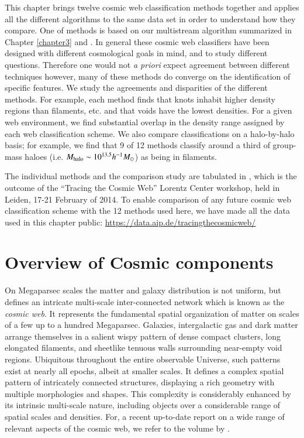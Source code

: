 This chapter brings twelve cosmic web classification methods together and applies all the different algorithms to the same data set in order to understand how they compare. One of methods is based on our multistream algorithm summarized in Chapter \ref{chapter3} and \cite{Ramachandra2015}. In general these cosmic web classifiers have been designed with different cosmological goals in mind, and to study different questions. Therefore one would not {\it a priori} expect agreement between different techniques however, many of these methods do converge on the identification of specific features. We study the agreements and disparities of the different methods. For example, each method finds that knots inhabit higher density regions than filaments, etc. and that voids have the lowest densities. For a given web environment, we find substantial overlap in the density range assigned by each web classification scheme. We also compare classifications on a halo-by-halo basis; for example, we find that 9 of 12 methods classify around a third of group-mass haloes (i.e. $M_{\rm halo}\sim10^{13.5}h^{-1}M_{\odot}$) as being in filaments. 

The individual methods and the comparison study are tabulated in \cite{Libeskind2018}, which is the outcome of the ``Tracing the Cosmic Web'' Lorentz Center workshop, held in Leiden, 17-21 February of 2014. To enable comparison of any future cosmic web classification scheme with the 12 methods used here, we have made all the data used in this chapter public: \url{https://data.aip.de/tracingthecosmicweb/}


\section{Overview of Cosmic components}
\label{section:6intro}
On Megaparsec scales the matter and galaxy distribution is not uniform, but defines an intricate multi-scale inter-connected network 
which is known as the \emph{cosmic web}. It represents the fundamental spatial organization of 
matter on scales of a few up to a hundred Megaparsec. Galaxies, intergalactic gas and dark matter arrange themselves in a salient wispy 
pattern of dense compact clusters, long elongated filaments, and sheetlike tenuous walls surrounding near-empty void regions. Ubiquitous throughout  
the entire observable Universe, such patterns  exist at nearly all epochs, albeit at smaller scales. It defines a complex spatial 
pattern of intricately connected structures, displaying a rich geometry with multiple morphologies and shapes. This complexity is 
considerably enhanced by its intrinsic multi-scale nature, including objects over a considerable range of spatial scales and densities. 
For, a recent up-to-date report on a wide range of relevant aspects of the cosmic web, we refer to the volume by \cite{Iau308}.

